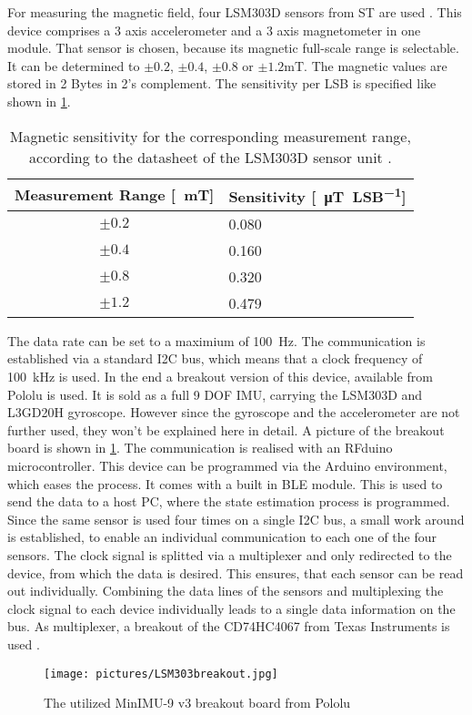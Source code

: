 For measuring the magnetic field, four LSM303D sensors from ST are used \cite{STlsm2012}. This device comprises a 3 axis accelerometer and a 3 axis magnetometer in one module. That sensor is chosen, because its magnetic full-scale range is selectable. It can be determined to $ \pm 0.2$, $ \pm 0.4 $, $ \pm 0.8 $ or $ \pm 1.2\si{\milli\tesla} $. The magnetic values are stored in 2 Bytes in 2's complement. The sensitivity per \ac{LSB} is specified like shown in \ref{tab:magSensitivity}.
\begin{table}[h]
\centering
\begin{tabular}{c|l}
\textbf{Measurement Range [\SI{}{\milli\tesla}]} & \textbf{Sensitivity [\SI{}{\micro\tesla \per LSB}]} \\ \hline
$ \pm 0.2 $ & 0.080 \\ \hline
$ \pm 0.4 $ & 0.160 \\ \hline
$ \pm 0.8 $ & 0.320 \\ \hline
$ \pm 1.2 $ & 0.479 \\ %
\end{tabular}
\caption[Magnetic sensitivity]{Magnetic sensitivity for the corresponding measurement range, according to the datasheet of the LSM303D sensor unit \cite{STlsm2012}.}
\label{tab:magSensitivity}
\end{table}
The data rate can be set to a maximium of \SI{100}{\Hz}. The communication is established via a standard I2C bus, which means that a clock frequency of \SI{100}{\kilo \Hz} is used. In the end a breakout version of this device, available from Pololu \cite{pol2016} is used. It is sold as a full 9 \ac{DOF} IMU, carrying the LSM303D and L3GD20H gyroscope. However since the gyroscope and the accelerometer are not further used, they won't be explained here in detail. A picture of the breakout board is shown in \ref{fig:breakout}. The communication is realised with an RFduino microcontroller. This device can be programmed via the Arduino environment, which eases the process. It comes with a built in \ac{BLE} module. This is used to send the data to a host PC, where the state estimation process is programmed. Since the same sensor is used four times on a single I2C bus, a small work around is established, to enable an individual communication to each one of the four sensors. The clock signal is splitted via a multiplexer and only redirected to the device, from which the data is desired. This ensures, that each sensor can be read out individually. Combining the data lines of the sensors and multiplexing the clock signal to each device individually leads to a single data information on the bus. As multiplexer, a breakout of the CD74HC4067 from Texas Instruments is used \cite{TImux2003}.
\begin{figure}
\centering
\texttt{[image: pictures/LSM303breakout.jpg]}
\caption[Breakout board of sensor unit]
{The utilized MinIMU-9 v3 breakout board from Pololu \cite{pol2016}}
\label{fig:breakout}
\end{figure}

